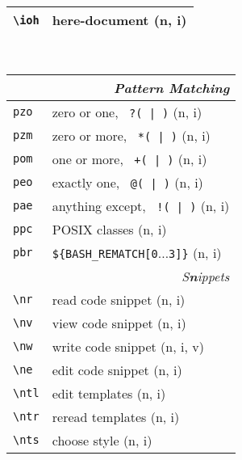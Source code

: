 \documentclass[oneside,11pt,landscape,DIV16]{scrartcl}
\begin{document}
\begin{multicols}{3}
\begin{center}
\begin{tabular}[]{|p{11mm}|p{60mm}|}
\hline \verb'\ioh'   & here-document                    \hfill (n, i)\\
\hline
%
\end{tabular}\\
%
\begin{tabular}[]{|p{11mm}|p{62mm}|}
\hline
\multicolumn{2}{|r|}{\textsl{\textbf{P}attern Matching}}     \\[1.0ex]
\hline     \verb'pzo' & zero or one,      \verb' ?( | )'  \hfill (n, i)\\ 
\hline     \verb'pzm' & zero or more,     \verb' *( | )'  \hfill (n, i)\\ 
\hline     \verb'pom' & one or more,      \verb' +( | )'  \hfill (n, i)\\ 
\hline     \verb'peo' & exactly one,      \verb' @( | )'  \hfill (n, i)\\ 
\hline     \verb'pae' & anything except,  \verb' !( | )'  \hfill (n, i)\\ 
\hline     \verb'ppc' & POSIX classes                     \hfill (n, i)\\ 
\hline     \verb'pbr' &  \verb'${BASH_REMATCH[0'$\ldots$\verb'3]}'  \hfill (n, i)\\ 
\hline
%
\hline
\multicolumn{2}{|r|}{\textsl{S\textbf{n}ippets}}               \\[1.0ex]
\hline \verb'\nr'  & read code snippet         \hfill (n, i)\\
\hline \verb'\nv'  & view code snippet         \hfill (n, i)\\
\hline \verb'\nw'  & write code snippet        \hfill (n, i, v)\\
\hline \verb'\ne'  & edit code snippet         \hfill (n, i)\\
\hline \verb'\ntl' & edit templates            \hfill (n, i)\\
\hline \verb'\ntr' & reread templates          \hfill (n, i)\\
\hline \verb'\nts' & choose style              \hfill (n, i)\\

\end{tabular}
\end{center}
\end{multicols}
\end{document}
